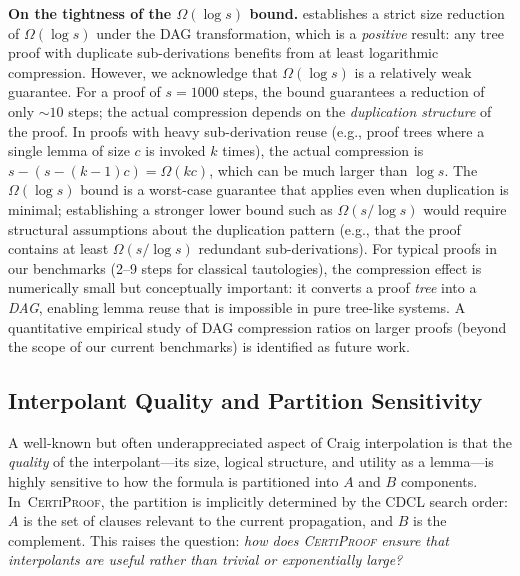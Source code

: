 \documentclass[acmtocl,review,anonymous]{acmart}
\newcommand{\CP}{\textsc{CertiProof}}
\begin{document}
\medskip
\noindent\textbf{On the tightness of the $\Omega(\log s)$ bound.}
 establishes a strict size reduction of
$\Omega(\log s)$ under the DAG transformation, which is a
\emph{positive} result: any tree proof with duplicate sub-derivations
benefits from at least logarithmic compression.  However, we
acknowledge that $\Omega(\log s)$ is a relatively weak guarantee.
For a proof of $s = 1000$ steps, the bound guarantees a reduction of
only ${\sim}10$ steps; the actual compression depends on the
\emph{duplication structure} of the proof.  In proofs with heavy
sub-derivation reuse (e.g., proof trees where a single lemma of size
$c$ is invoked $k$ times), the actual compression is
$s - (s - (k-1)c) = \Omega(k c)$, which can be much larger than
$\log s$.  The $\Omega(\log s)$ bound is a worst-case guarantee that
applies even when duplication is minimal; establishing a stronger
lower bound such as $\Omega(s / \log s)$ would require structural
assumptions about the duplication pattern (e.g., that the proof
contains at least $\Omega(s/\log s)$ redundant sub-derivations).
For typical proofs in our benchmarks (2--9 steps for classical
tautologies), the compression effect is numerically small but
conceptually important: it converts a proof \emph{tree} into a
\emph{DAG}, enabling lemma reuse that is impossible in pure
tree-like systems.  A quantitative empirical study of DAG compression
ratios on larger proofs (beyond the scope of our current benchmarks)
is identified as future work.

\subsection{Interpolant Quality and Partition Sensitivity}
\label{sec:interpolant-quality}

A well-known but often underappreciated aspect of Craig interpolation
is that the \emph{quality} of the interpolant---its size, logical
structure, and utility as a lemma---is highly sensitive to how the
formula is partitioned into $A$ and $B$ components.  In~\CP{}, the
partition is implicitly determined by the CDCL search order: $A$ is
the set of clauses relevant to the current propagation, and $B$ is
the complement.  This raises the question: \emph{how does \CP{}
ensure that interpolants are useful rather than trivial or
exponentially large?}
\end{document}
